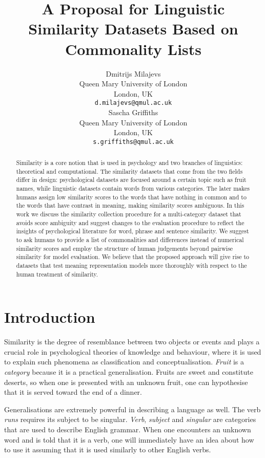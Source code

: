 \documentclass[11pt]{article}
\title{A Proposal for Linguistic Similarity Datasets Based on Commonality Lists}
\author{Dmitrijs Milajevs \\
  Queen Mary University of London \\
  London, UK \\
  {\tt d.milajevs@qmul.ac.uk} \\\And
  Sascha Griffiths \\
  Queen Mary University of London \\
  London, UK \\
  {\tt s.griffiths@qmul.ac.uk} \\
}
\date{}
\begin{document}
\maketitle

\begin{abstract}
Similarity is a core notion that is used in psychology and two branches of linguistics: theoretical and computational. The similarity datasets that come from the two fields differ in design: psychological datasets are focused around a certain topic such as fruit names, while linguistic datasets contain words from various categories. The later makes humans assign low similarity scores to the words that have nothing in common and to the words that have contrast in meaning, making similarity scores ambiguous. In this work we discuss the similarity collection procedure for a multi-category dataset that avoids score ambiguity and suggest changes to the evaluation procedure to reflect the insights of psychological literature for word, phrase and sentence similarity. We suggest to ask humans to provide a list of commonalities and differences instead of numerical similarity scores and employ the structure of human judgements beyond pairwise similarity for model evaluation. We believe that the proposed approach will give rise to datasets that test meaning representation models more thoroughly with respect to the human treatment of similarity.
\end{abstract}

\section{Introduction}
\label{sec:introduction}

Similarity is the degree of resemblance between two objects or events \cite{WCS:WCS1282} and plays a crucial role in psychological theories of knowledge and behaviour, where it is used to explain such phenomena as classification and conceptualisation. \textit{Fruit} is a \emph{category} because it is a practical generalisation. Fruits are sweet and constitute deserts, so when one is presented with an unknown fruit, one can hypothesise that it is served toward the end of a dinner.

Generalisations are extremely powerful in describing a language as well. The verb \textit{runs} requires its subject to be singular. \textit{Verb}, \textit{subject} and \textit{singular} are categories that are used to describe English grammar. When one encounters an unknown word and is told that it is a verb, one will immediately have an idea about how to use it assuming that it is used similarly to other English verbs.
\end{document}
